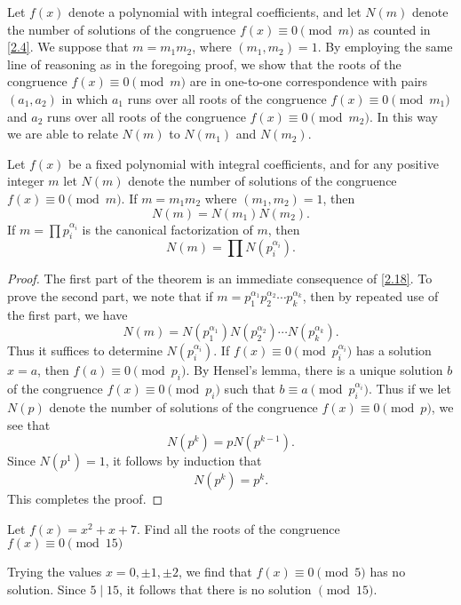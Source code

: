 \documentclass[11pt]{article}
\begin{document}
Let \(f(x)\) denote a polynomial with integral coefficients, and let \(N(m)\) denote the number of solutions of the congruence \(f(x) \equiv 0 \pmod{m}\) as counted in \cref{2.4}. We suppose that \(m = m_1 m_2\), where \((m_1, m_2) = 1\). By employing the same line of reasoning as in the foregoing proof, we show that the roots of the congruence \(f(x) \equiv 0 \pmod{m}\) are in one-to-one correspondence with pairs \((a_1, a_2)\) in which \(a_1\) runs over all roots of the congruence \(f(x) \equiv 0 \pmod{m_1}\) and \(a_2\) runs over all roots of the congruence \(f(x) \equiv 0 \pmod{m_2}\). In this way we are able to relate \(N(m)\) to \(N(m_1)\) and \(N(m_2)\).
\begin{theorem}\label{2.20}
	Let \(f(x)\) be a fixed polynomial with integral coefficients, and for any positive integer \(m\) let \(N(m)\) denote the number of solutions of the congruence \(f(x) \equiv 0 \pmod{m}\). If \(m = m_1 m_2\) where \((m_1, m_2) = 1\), then
	\[
		N(m) = N(m_1) N(m_2).
	\]
	If \(m = \prod p_i^{\alpha_i}\) is the canonical factorization of \(m\), then
	\[
		N(m) = \prod N(p_i^{\alpha_i}).
	\]
\end{theorem}

\begin{proof}
	The first part of the theorem is an immediate consequence of \cref{2.18}. To
	prove the second part, we note that if \(m = p_1^{\alpha_1} p_2^{\alpha_2} \cdots p_k^{\alpha_k}\), then by repeated use of the first part, we have
	\[
		N(m) = N(p_1^{\alpha_1}) N(p_2^{\alpha_2}) \cdots N(p_k^{\alpha_k}).
	\]
	Thus it suffices to determine \(N(p_i^{\alpha_i})\). If \(f(x) \equiv 0 \pmod{p_i^{\alpha_i}}\) has a solution \(x = a\), then \(f(a) \equiv 0 \pmod{p_i}\). By Hensel's lemma, there is a unique solution \(b\) of the congruence \(f(x) \equiv 0 \pmod{p_i}\) such that \(b \equiv a \pmod{p_i^{\alpha_i}}\). Thus if we let \(N(p)\) denote the number of solutions of the congruence \(f(x) \equiv 0 \pmod{p}\), we see that
	\[
		N(p^k) = p N(p^{k - 1}).
	\]
	Since \(N(p^1) = 1\), it follows by induction that
	\[
		N(p^k) = p^k.
	\]
	This completes the proof.
\end{proof}

\begin{example}
	Let \( f(x) = x^2 + x + 7 \). Find all the roots of the congruence \( f(x) \equiv 0 \pmod{15} \)
\end{example}
\begin{solution}
	Trying the values \(x = 0, \pm 1, \pm 2\), we find that \(f(x) \equiv 0 \pmod{5}\) has no solution. Since \(5 \mid 15\), it follows that there is no solution \(\pmod{15}\).
\end{solution}
\end{document}
